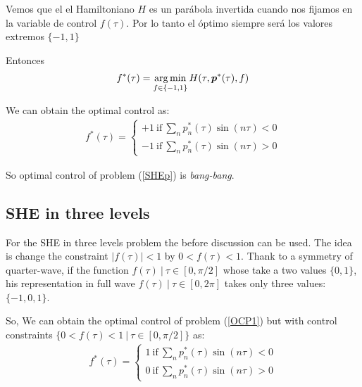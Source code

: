 Vemos que el el Hamiltoniano $H$ es un parábola invertida cuando nos fijamos en la variable  de control $f(\tau)$. Por lo tanto el óptimo siempre será los valores extremos $\{-1,1\}$

Entonces 
\begin{gather}
    f^*(\tau) = \operatorname*{arg\,min}_{f \in \{-1,1\}}  H(\tau,\bm{p}^*(\tau),f)
\end{gather}

We can obtain the optimal control as:
\begin{gather}
    f^*(\tau) = \begin{cases}
        +1 \ \text{if}  \ \sum_{n} p_n^*(\tau) \sin(n\tau) < 0 \\
        -1 \ \text{if}  \ \sum_{n} p_n^*(\tau) \sin(n\tau) > 0
    \end{cases}
\end{gather}

So optimal control of  problem (\ref{SHEp}) is \emph{bang-bang}. 

\subsection{SHE in three levels}

For the SHE in three levels problem the before discussion can be used. The idea is change the constraint $|f(\tau)| < 1 $ by $0<f(\tau)<1$.  Thank to a symmetry of quarter-wave, if the function $f(\tau) \ | \ \tau \in [0,\pi/2]$  whose take a two values $\{0,1\}$, his representation in full wave $f(\tau) \ | \ \tau \in [0,2\pi]$ takes only three values: $\{-1,0,1\}$.

So, We can obtain the optimal control of problem (\ref{OCP1}) but with control constraints $\{ 0<f(\tau)<1 \ | \ \tau \in [0,\pi/2] \}$ as:
\begin{gather}
    f^*(\tau) = \begin{cases}
        1 \ \text{if}  \ \sum_{n} p_n^*(\tau) \sin(n\tau) < 0 \\
        0 \ \text{if}  \ \sum_{n} p_n^*(\tau) \sin(n\tau) > 0
    \end{cases}
\end{gather}


